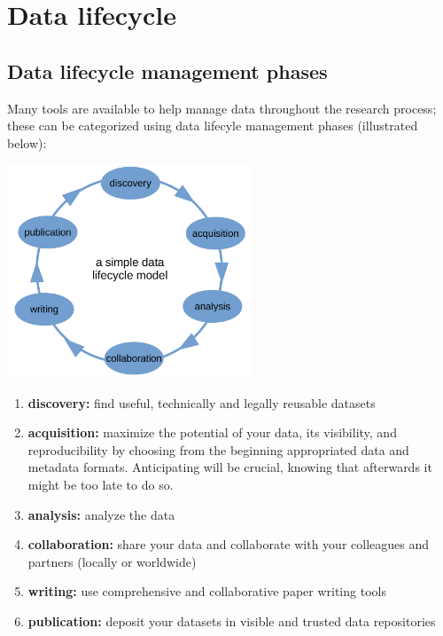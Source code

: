 \section{Data lifecycle}

\subsection{Data lifecycle management phases}
\noindent Many tools are available to help manage data throughout the research process; these can be categorized using data lifecyle management phases (illustrated below):

\begin{center}
\includegraphics[width=0.55\textwidth]{./images/lifecycle.png}
\end{center}

\begin{enumerate}
\item \textbf{discovery:} find useful, technically and legally reusable datasets
\item \textbf{acquisition:} maximize the potential of your data, its visibility, and reproducibility by choosing from the beginning appropriated data and metadata formats. Anticipating will be crucial, knowing that afterwards it might be too late to do so.
\item \textbf{analysis:} analyze the data
\item \textbf{collaboration:} share your data and collaborate with your colleagues and partners (locally or worldwide)
\item \textbf{writing:} use comprehensive and collaborative paper writing tools
\item \textbf{publication:} deposit your datasets in visible and trusted data repositories
\end{enumerate}

